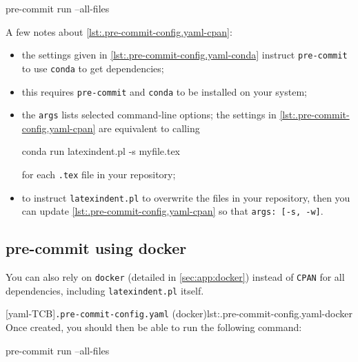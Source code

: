   \begin{commandshell}
pre-commit run --all-files
\end{commandshell}

  A few notes about \cref{lst:.pre-commit-config.yaml-cpan}:
  \begin{itemize}
   \item the settings given in \cref{lst:.pre-commit-config.yaml-conda} instruct
         \texttt{pre-commit} to use \texttt{conda} to get dependencies;
   \item this requires \texttt{pre-commit} and \texttt{conda} to be installed on your
         system;
   \item the \texttt{args} lists selected command-line options; the settings in
         \cref{lst:.pre-commit-config.yaml-cpan} are equivalent to calling

         \begin{commandshell}
conda run latexindent.pl -s myfile.tex
\end{commandshell}

         for each \texttt{.tex} file in your repository;
   \item to instruct \texttt{latexindent.pl} to overwrite the files in your repository,
         then you can update \cref{lst:.pre-commit-config.yaml-cpan} so that
         \texttt{args: [-s, -w]}.
  \end{itemize}

 \subsection{pre-commit using docker}\label{sec:pre-commit-docker}

  You can also rely on \texttt{docker} (detailed in \cref{sec:app:docker}) instead of
  \texttt{CPAN} for all dependencies, including \texttt{latexindent.pl} itself.
    

  [yaml-TCB]{\texttt{.pre-commit-config.yaml} (docker)}{lst:.pre-commit-config.yaml-docker}
  Once created, you should then be able to run the following command:

  \begin{commandshell}
pre-commit run --all-files
\end{commandshell}

